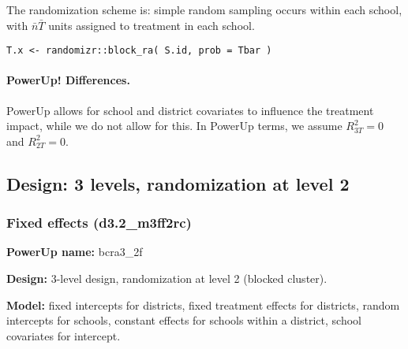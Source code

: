 \documentclass[12pt]{article}
\begin{document}
The randomization scheme is: simple random sampling occurs within each school, with $\bar{n}\bar{T}$ units assigned to treatment in each school.
\begin{verbatim}
T.x <- randomizr::block_ra( S.id, prob = Tbar )
\end{verbatim}

\paragraph{PowerUp! Differences.}
PowerUp allows for school and district covariates to influence the treatment impact, while we do not allow for this. In PowerUp terms, we assume $R^2_{3T} = 0$ and $R^2_{2T} = 0$.



\newpage 
\subsection{Design: 3 levels, randomization at level 2}


\subsubsection{Fixed effects (d3.2\_m3ff2rc)}

\textbf{PowerUp name:} bcra3\_2f

\textbf{Design:} 3-level design, randomization at level 2 (blocked cluster).

\textbf{Model:} fixed intercepts for districts, fixed treatment effects for districts, random intercepts for schools, constant effects for schools within a district, school covariates for intercept.
\end{document}

